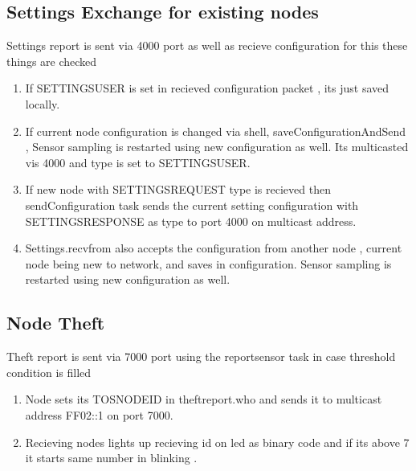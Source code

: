 \documentclass[11pt]{article} %
\begin{document}
\subsection*{Settings Exchange for existing nodes}
Settings report is sent via 4000 port as well as recieve configuration for this these things are checked
\begin{enumerate}
\item If SETTINGS\textunderscore USER is set in recieved configuration packet , its just saved locally.
\item If current node configuration is changed via shell, saveConfigurationAndSend , 
		Sensor sampling is restarted using new configuration as well.
		Its multicasted vis 4000 and type is set to SETTINGS\textunderscore USER.
\item If new node with SETTINGS\textunderscore REQUEST type is recieved then sendConfiguration task sends the current setting configuration 
		with SETTINGS\textunderscore RESPONSE as type to port 4000 on multicast address.
\item Settings.recvfrom also accepts the configuration from another node , current node being new to network, and saves in 
		configuration. Sensor sampling is restarted using new configuration as well.

\end{enumerate}

\subsection*{Node Theft}
Theft report is sent via 7000 port using the report\textunderscore sensor task in case threshold condition is filled
\begin{enumerate}
\item Node sets its TOS\textunderscore NODE\textunderscore ID in theft\textunderscore report.who and sends it to multicast address FF02::1 on port 7000.
\item Recieving nodes lights up recieving id on led as binary code and if its above 7 it starts same number in blinking .
\end{enumerate}
\end{document}
